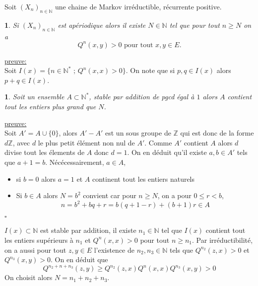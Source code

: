 \documentclass[8pt,notheorems]{beamer}
\def \N{\mathbb N}
\newtheorem{prop}{\translate{Proposition}}
\newtheorem{lemma}{\translate{Lemme}}
\theoremstyle{definition}
\theoremstyle{example}
\theoremstyle{mystyle}
\theoremstyle{plain}
\begin{document}
\begin{frame}[allowframebreaks]

Soit $(X_n)_{n\in\N}$ une chaine de Markov irréductible, récurrente positive.
\begin{prop}\label{prop:MatrixQPositive}
Si $(X_n)_{n\in\N}$ est apériodique alors il existe $N\in\N$ tel que pour tout $n\geq N$ on a
$$
Q^{n}(x,y)>0\text{ pour tout }x,y\in E.
$$
\end{prop}
\underline{preuve:}\\
Soit $I(x)=\{n\in\N^{\ast}\text{ ; }Q^{n}(x,x)>0\}$. On note que si $p,q\in I(x)$ alors $p+q\in I(x)$.
\begin{lemma}
Soit un ensemble $A\subset\N^{\ast}$, stable par addition de pgcd égal à $1$ alors $A$ contient tout les entiers plus grand que $N$.
\end{lemma}
\underline{preuve:}\\
Soit $A'=A\cup\{0\}$, alors $A'-A'$ est un sous groupe de $\mathbb{Z}$ qui est donc de la forme $d\mathbb{Z}$, avec $d$ le plus petit élément non nul de $A'$. Comme $A'$ contient $A$ alors $d$ divise tout les élements de $A$ donc $d=1$. On en déduit qu'il existe $a,b\in A'$ tels que $a+1=b$. Nécécessairement, $a\in A$,
\begin{itemize}
\item si $b=0$ alors $a=1$ et $A$ continent tout les entiers naturels
\item Si $b\in A$ alors $N= b^{2}$ convient car pour $n\geq N$, on a pour $0\leq r<b$,
$$
n=b^{2}+bq+r=b(q+1-r)+(b+1)r\in A
$$
\end{itemize}
 $\square$


$I(x)\subset\N$ est stable par addition, il existe $n_1\in\N$ tel que $I(x)$ contient tout les entiers supérieurs à $n_1$ et $Q^{n}(x,x)>0$ pour tout $n\geq n_1$. Par irréductibilité, on a aussi pour tout $z,y\in E$ l'existence de $n_2,n_3\in\N$ tels que $Q^{n_2}(z,x)>0$ et $Q^{n_3}(x,y)>0$. On en déduit que
$$
Q^{n_2+n+n_3}(z,y)\geq Q^{n_2}(z,x)Q^{n}(x,x)Q^{n_3}(x,y)>0
$$
On choisit alors $N=n_1+n_2+n_3$.
\end{frame}
\end{document}
